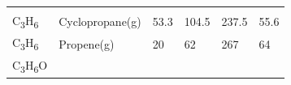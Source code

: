\documentclass[
  9pt,
]{extbook}
\theoremstyle{definition}
\theoremstyle{definition}
\theoremstyle{definition}
\theoremstyle{remark}
\begin{document}
\begin{longtable}[]{@{}llllll@{}}
\begin{minipage}[t]{0.15\columnwidth}
\strut
\end{minipage} & \begin{minipage}[t]{0.14\columnwidth}\raggedright
\strut
\end{minipage} & \begin{minipage}[t]{0.14\columnwidth}\raggedright
\strut
\end{minipage}\tabularnewline
\begin{minipage}[t]{0.07\columnwidth}\raggedright
C\textsubscript{3}H\textsubscript{6}\strut
\end{minipage} & \begin{minipage}[t]{0.17\columnwidth}\raggedright
Cyclopropane(g)\strut
\end{minipage} & \begin{minipage}[t]{0.15\columnwidth}\raggedright
53.3\strut
\end{minipage} & \begin{minipage}[t]{0.15\columnwidth}\raggedright
104.5\strut
\end{minipage} & \begin{minipage}[t]{0.14\columnwidth}\raggedright
237.5\strut
\end{minipage} & \begin{minipage}[t]{0.14\columnwidth}\raggedright
55.6\strut
\end{minipage}\tabularnewline
\begin{minipage}[t]{0.07\columnwidth}\raggedright
C\textsubscript{3}H\textsubscript{6}\strut
\end{minipage} & \begin{minipage}[t]{0.17\columnwidth}\raggedright
Propene(g)\strut
\end{minipage} & \begin{minipage}[t]{0.15\columnwidth}\raggedright
20\strut
\end{minipage} & \begin{minipage}[t]{0.15\columnwidth}\raggedright
62\strut
\end{minipage} & \begin{minipage}[t]{0.14\columnwidth}\raggedright
267\strut
\end{minipage} & \begin{minipage}[t]{0.14\columnwidth}\raggedright
64\strut
\end{minipage}\tabularnewline
\begin{minipage}[t]{0.07\columnwidth}\raggedright
C\textsubscript{3}H\textsubscript{6}O\strut
\end{minipage} & \begin{minipage}[t]{0.17\columnwidth}\raggedright

\end{minipage}
\end{longtable}
\end{document}
